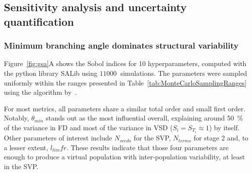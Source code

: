 \documentclass[11pt,]{article}
\begin{document}
\subsection{Sensitivity analysis and uncertainty quantification}\label{sec:gsaUQ}

\subsubsection{Minimum branching angle dominates structural variability}\label{sec:gsa}

Figure~\ref{fig:gsa}A shows the Sobol indices for \SI{10}{} hyperparameters, computed with the python library SALib\cite{Iwanaga_2022,Herman_2017} using $\SI{11000}{}$ simulations.
The parameters were sampled uniformly within the ranges presented in Table~\ref{tab:MonteCarloSamplingRanges} using the algorithm by~\cite{Saltelli2002}.

For most metrics, all parameters share a similar total order and small first order.
Notably, $\theta_{min}$ stands out as the most influential overall, explaining around \SI{50}{\percent} of the variance in FD and most of the variance in VSD ($S_i=S_{T_i}\approx 1$) by itself.
Other parameters of interest include $N_{seeds}$ for the SVP, $N_{terms}$ for stage 2 and, to a lesser extent, $l_{lim}fr$.
These results indicate that those four parameters are enough to produce a virtual population with inter-population variability, at least in the SVP.
\end{document}

